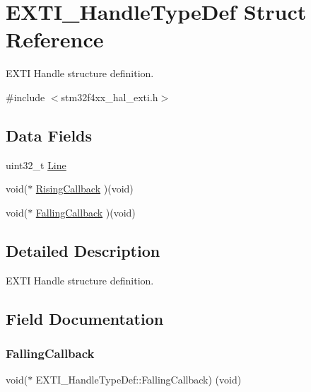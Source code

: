 \hypertarget{struct_e_x_t_i___handle_type_def}{}\section{E\+X\+T\+I\+\_\+\+Handle\+Type\+Def Struct Reference}
\label{struct_e_x_t_i___handle_type_def}


E\+X\+TI Handle structure definition.  




{\ttfamily \#include $<$stm32f4xx\+\_\+hal\+\_\+exti.\+h$>$}

\subsection*{Data Fields}
\begin{DoxyCompactItemize}
\item 
uint32\+\_\+t \hyperlink{struct_e_x_t_i___handle_type_def_a6a2875051ad4276be5322ffa99e12566}{Line}
\item 
void($\ast$ \hyperlink{struct_e_x_t_i___handle_type_def_a9d74e688439641a4d68d2730a61b149f}{Rising\+Callback} )(void)
\item 
void($\ast$ \hyperlink{struct_e_x_t_i___handle_type_def_ac15c0e03257455a1217c5ebf72189812}{Falling\+Callback} )(void)
\end{DoxyCompactItemize}


\subsection{Detailed Description}
E\+X\+TI Handle structure definition. 

\subsection{Field Documentation}
\mbox{\label{struct_e_x_t_i___handle_type_def_ac15c0e03257455a1217c5ebf72189812}} 
\subsubsection{\texorpdfstring{Falling\+Callback}{FallingCallback}}
{\footnotesize\ttfamily void($\ast$  E\+X\+T\+I\+\_\+\+Handle\+Type\+Def\+::\+Falling\+Callback) (void)}

